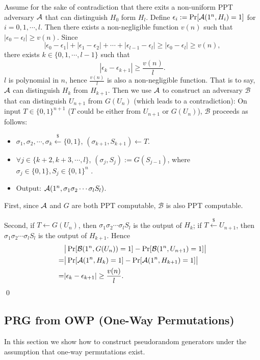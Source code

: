 \documentclass[12pt]{tufte-book}
\begin{document}
Assume for the sake of contradiction that there exits a non-uniform PPT adversary $\mathcal{A}$ that can distinguish $H_0$ form $H_l$.
Define $\epsilon_i := \Pr[\mathcal{A}(1^n, H_i)=1]$ for $i = 0, 1, \cdots, l$.
Then there exists a non-negligible function $v(n)$ such that $|\epsilon_0 - \epsilon_l| \geq v(n)$.
Since
\[
|\epsilon_0 - \epsilon_1| +
|\epsilon_1 - \epsilon_2| +
\cdots +
|\epsilon_{l-1} - \epsilon_l| \geq
|\epsilon_0 - \epsilon_l|
\geq v(n),
\]
there exists $k \in \{0, 1, \cdots, l-1\}$ such that
\[
|\epsilon_{k} - \epsilon_{k+1}| \geq \frac{v(n)}{l}.
\]
$l$ is polynomial in $n$, hence $\frac{v(n)}{l}$ is also a non-negligible function.
That is to say, $\mathcal{A}$ can distinguish $H_{k}$ from $H_{k+1}$.
Then we use $\mathcal{A}$ to construct an adversary $\mathcal{B}$ that can distinguish $U_{n+1}$ from $G(U_n)$ (which leads to a contradiction):
On input $T \in \{0, 1\}^{n+1}$ ($T$ could be either from $U_{n+1}$ or $G(U_n)$), $\mathcal{B}$ proceeds as follows:
\begin{itemize}
\item $\sigma_1, \sigma_2, \cdots, \sigma_k \xleftarrow{\$} \{0, 1\}$, $(\sigma_{k+1}, S_{k+1}) \gets T$.
\item $\forall j \in \{k+2, k+3, \cdots, l\}$, $(\sigma_j, S_j) := G(S_{j-1})$, where $\sigma_j \in \{0, 1\}, S_j \in \{0, 1\}^n$ .
\item Output: $\mathcal{A}(1^n, \sigma_1 \sigma_2 \cdots \sigma_l S_l)$.
\end{itemize}

First, since $\mathcal{A}$ and $G$ are both PPT computable, $\mathcal{B}$ is also PPT computable.

Second, if $T\gets G(U_n)$, then $\sigma_1 \sigma_2 \cdots \sigma_l S_l$ is the output of  $H_{k}$; if $T \stackrel{\$}\leftarrow U_{n+1}$, then $\sigma_1 \sigma_2 \cdots \sigma_l S_l$ is the output of $H_{k+1}$.
Hence
\begin{align*}
&\big|\Pr[\mathcal{B}(1^n, G(U_n)) = 1] - \Pr[\mathcal{B}(1^n, U_{n+1}) = 1]\big|\\
=& \big|\Pr[\mathcal{A}(1^n,H_k) = 1] - \Pr[\mathcal{A}(1^n,H_{k+1}) = 1]\big|\\
=&
|\epsilon_{k} - \epsilon_{k+1}| \geq \frac{v(n)}{l}.
\end{align*}
\qed

\subsection{PRG from OWP (One-Way Permutations)}
In this section we show how to construct pseudorandom generators under the assumption that one-way permutations exist.
\end{document}
